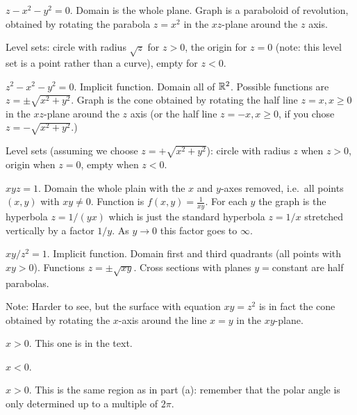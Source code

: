 \item[{\bfseries(III5.7d)}]

$z-x^2-y^2=0$.
Domain is the whole plane.
Graph is a paraboloid of revolution, obtained by rotating the
parabola $z=x^2$ in the $xz$-plane around the $z$ axis.

Level sets: circle with radius $\sqrt{z}$ for $z>0$,
the origin for $z=0$ (note: this level set is a point rather than a curve),
empty for $z<0$.
\bigskip

\item[{\bfseries(III5.7e)}]

$z^2-x^2-y^2=0$.
Implicit function.  Domain all of $\mathbb{R}^2$.
Possible functions are $z=\pm\sqrt{x^2+y^2}$.
Graph is the cone obtained by rotating the
half line $z=x, x\geq0$ in the $xz$-plane around the $z$ axis
(or the half line $z=-x, x\geq0$, if you chose $z=-\sqrt{x^2+y^2}$.)

Level sets (assuming we choose $z=+\sqrt{x^2+y^2}$):  circle with radius
$z$ when $z>0$, origin when $z=0$, empty when $z<0$.
\bigskip

\item[{\bfseries(III5.7f)}]

$xyz=1$.
Domain the whole plain with the $x$ and $y$-axes removed, i.e.\ all
points $(x, y)$ with $xy\ne0$.
Function is $f(x, y) = \frac{1} {xy}$.
For each $y$ the graph is the hyperbola $z=1/(yx)$ which is just the
standard hyperbola $z=1/x$ stretched vertically by a factor $1/y$.
As $y\to 0$ this factor goes to $\infty$.
\bigskip

\item[{\bfseries(III5.7g)}]

$xy/z^2=1$.
Implicit function.
Domain first and third quadrants (all points with $xy>0$).
Functions $z= \pm \sqrt{xy}$.
Cross sections with planes $y=$constant are half parabolas.

Note: Harder to see, but the surface with equation $xy=z^2$ is in fact
the cone obtained by rotating the $x$-axis around the line
$x=y$ in the $xy$-plane.
\bigskip

\item[{\bfseries(III5.8a)}]

$x>0$.  This one is in the text.
\bigskip

\item[{\bfseries(III5.8b)}]

$x<0$.
\bigskip

\item[{\bfseries(III5.8c)}]

$x>0$.  This is the same region as in part (a):  remember that the polar angle is
only determined up to a multiple of $2\pi$.
\bigskip


